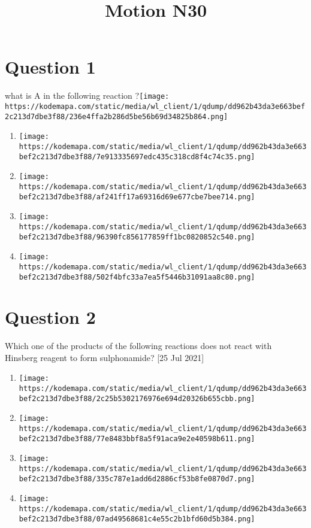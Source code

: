 \documentclass{article}
\title{Motion N30}
\begin{document}
                    \maketitle
                    \section*{Question 1}
what is A in the following reaction ?\texttt{[image: https://kodemapa.com/static/media/wl\_client/1/qdump/dd962b43da3e663bef2c213d7dbe3f88/236e4ffa2b286d5be56b69d34825b864.png]}\newline
\begin{enumerate}[label=(\alph*)]
\item \texttt{[image: https://kodemapa.com/static/media/wl\_client/1/qdump/dd962b43da3e663bef2c213d7dbe3f88/7e913335697edc435c318cd8f4c74c35.png]}
\item \texttt{[image: https://kodemapa.com/static/media/wl\_client/1/qdump/dd962b43da3e663bef2c213d7dbe3f88/af241ff17a69316d69e677cbe7bee714.png]}
\item \texttt{[image: https://kodemapa.com/static/media/wl\_client/1/qdump/dd962b43da3e663bef2c213d7dbe3f88/96390fc856177859ff1bc0820852c540.png]}
\item \texttt{[image: https://kodemapa.com/static/media/wl\_client/1/qdump/dd962b43da3e663bef2c213d7dbe3f88/502f4bfc33a7ea5f5446b31091aa8c80.png]}
\end{enumerate}
\newpage
\section*{Question 2}
Which one of the products of the following reactions does not react with Hinsberg reagent to form sulphonamide? [25 Jul 2021]
\begin{enumerate}[label=(\alph*)]
\item \texttt{[image: https://kodemapa.com/static/media/wl\_client/1/qdump/dd962b43da3e663bef2c213d7dbe3f88/2c25b5302176976e694d20326b655cbb.png]}
\item \texttt{[image: https://kodemapa.com/static/media/wl\_client/1/qdump/dd962b43da3e663bef2c213d7dbe3f88/77e8483bbf8a5f91aca9e2e40598b611.png]}
\item \texttt{[image: https://kodemapa.com/static/media/wl\_client/1/qdump/dd962b43da3e663bef2c213d7dbe3f88/335c787e1add6d2886cf53b8fe0870d7.png]}
\item \texttt{[image: https://kodemapa.com/static/media/wl\_client/1/qdump/dd962b43da3e663bef2c213d7dbe3f88/07ad49568681c4e55c2b1bfd60d5b384.png]}
\end{enumerate}
\newpage
\end{document}
